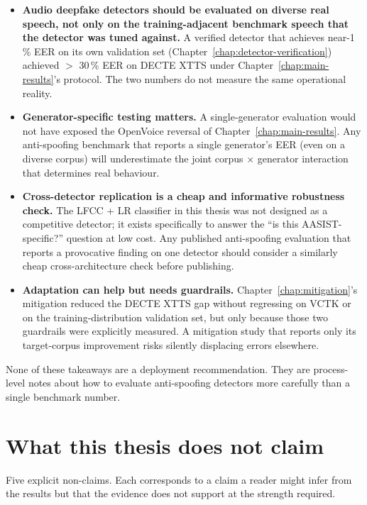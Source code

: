 \begin{itemize}
    \item \textbf{Audio deepfake detectors should be evaluated on diverse real
        speech, not only on the training-adjacent benchmark speech that
        the detector was tuned against.} A verified detector that
        achieves near-1\,\% EER on its own validation set (Chapter~\ref{chap:detector-verification})
        achieved $>$ 30\,\% EER on DECTE XTTS under Chapter~\ref{chap:main-results}'s protocol.
        The two numbers do not measure the same operational reality.
    \item \textbf{Generator-specific testing matters.} A single-generator
        evaluation would not have exposed the OpenVoice reversal of
        Chapter~\ref{chap:main-results}. Any anti-spoofing benchmark that reports a single
        generator's EER (even on a diverse corpus) will underestimate
        the joint corpus $\times$ generator interaction that determines real
        behaviour.
    \item \textbf{Cross-detector replication is a cheap and informative
        robustness check.} The LFCC + LR classifier in this thesis was
        not designed as a competitive detector; it exists specifically
        to answer the ``is this AASIST-specific?'' question at low cost.
        Any published anti-spoofing evaluation that reports a
        provocative finding on one detector should consider a similarly
        cheap cross-architecture check before publishing.
    \item \textbf{Adaptation can help but needs guardrails.} Chapter~\ref{chap:mitigation}'s
        mitigation reduced the DECTE XTTS gap without regressing on
        VCTK or on the training-distribution validation set, but only
        because those two guardrails were explicitly measured. A
        mitigation study that reports only its target-corpus
        improvement risks silently displacing errors elsewhere.
\end{itemize}

None of these takeaways are a deployment recommendation.
They are process-level notes about how to evaluate anti-spoofing
detectors more carefully than a single benchmark number.


\section{What this thesis does not claim}
\label{sec:discussion-non-claims}

Five explicit non-claims. Each corresponds to a claim a reader
might infer from the results but that the evidence does not
support at the strength required.

